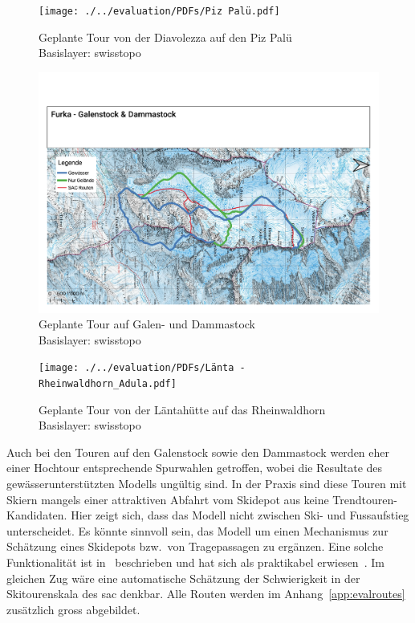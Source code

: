\begin{figure}[ht]
  \centering
  \texttt{[image: ./../evaluation/PDFs/Piz Palü.pdf]}
  \caption{Geplante Tour von der Diavolezza auf den Piz Palü\\Basislayer: swisstopo}\label{fig:pizpalu}
\end{figure}
\begin{figure}[ht]
  \centering
  \includegraphics[page=1,width=.9\linewidth]{./../evaluation/PDFs/Furka - Galenstock & Dammastock.pdf}
  \caption{Geplante Tour auf Galen- und Dammastock\\Basislayer: swisstopo}\label{fig:pizpalu}
\end{figure}
\begin{figure}[ht]
  \centering
  \texttt{[image: ./../evaluation/PDFs/Länta - Rheinwaldhorn\_Adula.pdf]}
  \caption{Geplante Tour von der Läntahütte auf das Rheinwaldhorn\\Basislayer: swisstopo}\label{fig:pizpalu}
\end{figure}

Auch bei den Touren auf den Galenstock sowie den Dammastock werden eher einer Hochtour entsprechende Spurwahlen getroffen, wobei die Resultate des gewässerunterstützten Modells ungültig sind. 
In der Praxis sind diese Touren mit Skiern mangels einer attraktiven Abfahrt vom Skidepot aus keine Trendtouren-Kandidaten. Hier zeigt sich, dass das Modell nicht zwischen Ski- und Fussaufstieg unterscheidet. Es könnte sinnvoll sein, das Modell um einen Mechanismus zur Schätzung eines Skidepots bzw.\ von Tragepassagen zu ergänzen. Eine solche Funktionalität ist in\ \citeauthor{footandcautionsection} beschrieben und hat sich als praktikabel erwiesen~\cite{footandcautionsection}. Im gleichen Zug wäre eine automatische Schätzung der Schwierigkeit in der Skitourenskala des \acrshort{sac} denkbar. 
Alle Routen werden im Anhang\ \ref{app:evalroutes} zusätzlich gross abgebildet.

